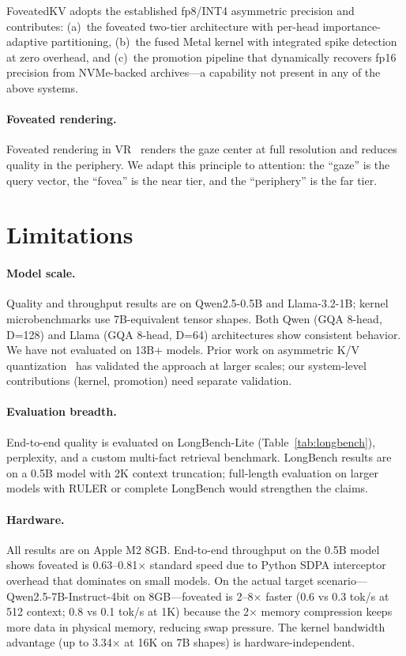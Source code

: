 \documentclass{article}
\begin{document}
FoveatedKV adopts the established fp8/INT4 asymmetric precision and
contributes: (a)~the foveated two-tier architecture with per-head
importance-adaptive partitioning, (b)~the fused Metal kernel with
integrated spike detection at zero overhead, and (c)~the promotion
pipeline that dynamically recovers fp16 precision from NVMe-backed
archives---a capability not present in any of the above systems.

\paragraph{Foveated rendering.}
Foveated rendering in VR~\cite{guenter2012} renders the gaze center at
full resolution and reduces quality in the periphery. We adapt this
principle to attention: the ``gaze'' is the query vector, the ``fovea''
is the near tier, and the ``periphery'' is the far tier.

\section{Limitations}

\paragraph{Model scale.} Quality and throughput results are on
Qwen2.5-0.5B and Llama-3.2-1B; kernel microbenchmarks use 7B-equivalent
tensor shapes. Both Qwen (GQA 8-head, D=128) and Llama (GQA 8-head,
D=64) architectures show consistent behavior. We have not evaluated on
13B+ models. Prior work on asymmetric K/V quantization~\cite{leankv,
kvadaquant} has validated the approach at larger scales; our system-level
contributions (kernel, promotion) need separate validation.

\paragraph{Evaluation breadth.} End-to-end quality is evaluated on
LongBench-Lite (Table~\ref{tab:longbench}), perplexity, and a custom
multi-fact retrieval benchmark. LongBench results are on a 0.5B model
with 2K context truncation; full-length evaluation on larger models
with RULER or complete LongBench would strengthen the claims.

\paragraph{Hardware.} All results are on Apple M2 8GB. End-to-end
throughput on the 0.5B model shows foveated is 0.63--0.81$\times$
standard speed due to Python SDPA interceptor overhead that dominates
on small models. On the actual target scenario---Qwen2.5-7B-Instruct-4bit
on 8GB---foveated is 2--8$\times$ faster (0.6 vs 0.3 tok/s at 512
context; 0.8 vs 0.1 tok/s at 1K) because the 2$\times$ memory
compression keeps more data in physical memory, reducing swap pressure.
The kernel bandwidth advantage (up to 3.34$\times$ at 16K on 7B shapes)
is hardware-independent.
\end{document}
